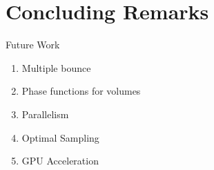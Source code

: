 \documentclass[10pt,compress,professionalfont]{beamer}
\begin{document}
\section{Concluding Remarks}
\begin{frame}{Future Work}

    \begin{enumerate}
        \item Multiple bounce
        \item Phase functions for volumes
        \item Parallelism
        \item Optimal Sampling
        \item GPU Acceleration
    \end{enumerate}

\end{frame}
\end{document}
